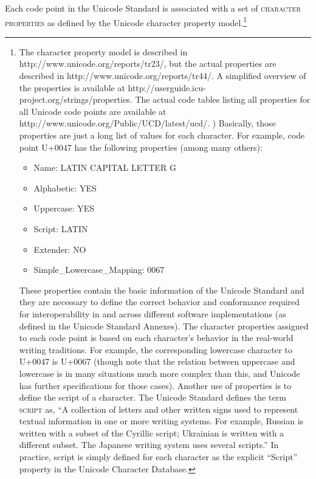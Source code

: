 {{{{{{{{{{{{{Each code point in the Unicode Standard is associated with a set of \textsc{character properties} as defined by the Unicode character property model.\footnote{The character property model is described in http://www.unicode.org/reports/tr23/, but the actual properties are described in http://www.unicode.org/reports/tr44/. A simplified overview of the properties is available at http://userguide.icu-project.org/strings/properties. The actual code tables listing all properties for all Unicode code points are available at http://www.unicode.org/Public/UCD/latest/ucd/. ) Basically, those properties are just a long list of values for each character. For example, code point U+0047 has the following properties (among many others):
\begin{itemize}
	\item Name: LATIN CAPITAL LETTER G 
	\item Alphabetic: YES 
	\item Uppercase: YES 
	\item Script: LATIN 
	\item Extender: NO 
	\item Simple\_Lowercase\_Mapping: 0067 
\end{itemize}

These properties contain the basic information of the Unicode Standard and they are necessary to define the correct behavior and conformance required for interoperability in and across different software implementations (as defined in the Unicode Standard Annexes). The character properties assigned to each code point is based on each character's behavior in the real-world writing traditions. For example, the corresponding lowercase character to U+0047 is U+0067 (though note that the relation between uppercase and lowercase is in many situations much more complex than this, and Unicode has further specifications for those cases). Another use of properties is to define the script of a character. The Unicode Standard defines the term \textsc{script} as, ``A collection of letters and other written signs used to represent textual information in one or more writing systems. For example, Russian is written with a subset of the Cyrillic script; Ukrainian is written with a different subset. The Japanese writing system uses several scripts.'' In practice, script is simply defined for each character as the explicit ``Script'' property in the Unicode Character Database.

}}}}}}}}}}}}}}
